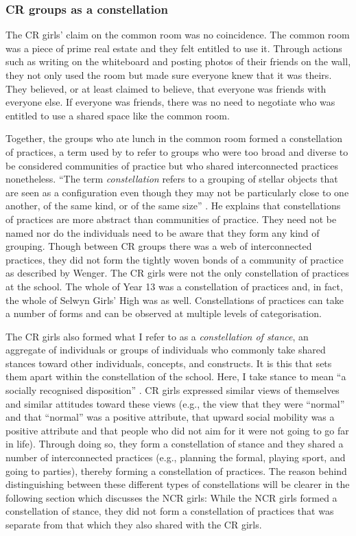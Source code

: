 \largerpage
\subsubsection{CR groups as a constellation}
  
The CR girls' claim on the common room was no coincidence. The common room was a piece of prime real estate and they felt entitled to use it. Through actions such as writing on the whiteboard and posting photos of their friends on the wall, they not only used the room but made sure everyone knew that it was theirs. They believed, or at least claimed to believe, that everyone was friends with everyone else. If everyone was friends, there was no need to negotiate who was entitled to use a shared space like the common room.

Together, the groups who ate lunch in the common room formed a constellation of practices, a term used by \citet{wenger1998} to refer to groups who were too broad and diverse to be considered communities of practice but who shared interconnected practices nonetheless. ``The term \textit{constellation} refers to a grouping of stellar objects that are seen as a configuration even though they may not be particularly close to one another, of the same kind, or of the same size'' \citep[127]{wenger1998}. He explains that constellations of practices are more abstract than communities of practice.  They need not be named nor do the individuals need to be aware that they form any kind of grouping. Though between CR groups there was a web of interconnected practices, they did not form the tightly woven bonds of a community of practice as described by Wenger. The CR girls were not the only constellation of practices at the school. The whole of Year 13 was a constellation of practices and, in fact, the whole of Selwyn Girls' High was as well. Constellations of practices can take a number of forms and can be observed at multiple levels of categorisation.

The CR girls also formed what I refer to as a \textit{constellation of stance}, an aggregate of individuals or groups of individuals who commonly take shared stances toward other individuals, concepts, and constructs. It is this that sets them apart within the constellation of the school. Here, I take stance to mean ``a socially recognised disposition'' \citep[2]{ochs1990}. CR girls expressed similar views of themselves and similar attitudes toward these views (e.g., the view that they were ``normal'' and that ``normal'' was a positive attribute, that upward social mobility was a positive attribute and that people who did not aim for it were not going to go far in life). Through doing so, they form a constellation of stance and they shared a number of interconnected practices (e.g., planning the formal, playing sport, and going to parties), thereby forming a constellation of practices. The reason behind distinguishing between these different types of constellations will be clearer in the following section which discusses the NCR girls: While the NCR girls formed a constellation of stance, they did not form a constellation of practices that was separate from that which they also shared with the CR girls.

